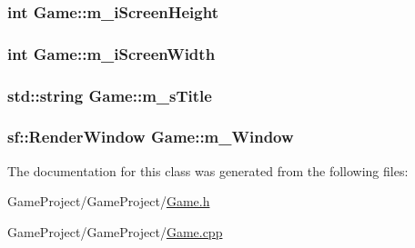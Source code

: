 \hypertarget{class_game_a5562cfe8b41c01e1375aaf4eb74497fc}{
\subsubsection[{m\-\_\-i\-Screen\-Height}]{\setlength{\rightskip}{0pt plus 5cm}int Game\-::m\-\_\-i\-Screen\-Height\hspace{0.3cm}{\ttfamily [private]}}}\label{class_game_a5562cfe8b41c01e1375aaf4eb74497fc}
\hypertarget{class_game_a6b7dbdcfbdcb7f9f5ee1cef26f5ed403}{
\subsubsection[{m\-\_\-i\-Screen\-Width}]{\setlength{\rightskip}{0pt plus 5cm}int Game\-::m\-\_\-i\-Screen\-Width\hspace{0.3cm}{\ttfamily [private]}}}\label{class_game_a6b7dbdcfbdcb7f9f5ee1cef26f5ed403}
\hypertarget{class_game_a87ca4ef9637bc4a70bcc732f1d2dc422}{
\subsubsection[{m\-\_\-s\-Title}]{\setlength{\rightskip}{0pt plus 5cm}std\-::string Game\-::m\-\_\-s\-Title\hspace{0.3cm}{\ttfamily [private]}}}\label{class_game_a87ca4ef9637bc4a70bcc732f1d2dc422}
\hypertarget{class_game_a69e8c9b7364c62e67f104808da950f8b}{
\subsubsection[{m\-\_\-\-Window}]{\setlength{\rightskip}{0pt plus 5cm}sf\-::\-Render\-Window Game\-::m\-\_\-\-Window\hspace{0.3cm}{\ttfamily [private]}}}\label{class_game_a69e8c9b7364c62e67f104808da950f8b}


The documentation for this class was generated from the following files\-:\begin{DoxyCompactItemize}
\item 
Game\-Project/\-Game\-Project/\hyperlink{_game_8h}{Game.\-h}\item 
Game\-Project/\-Game\-Project/\hyperlink{_game_8cpp}{Game.\-cpp}\end{DoxyCompactItemize}
